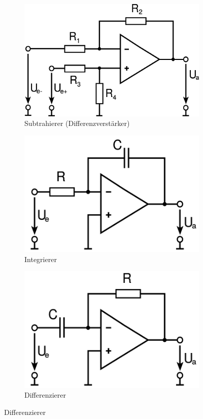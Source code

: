 	\begin{figure}[h]
		\begin{subfigure}{0.25\textwidth}
		\includegraphics[width=\textwidth]{images/Differential_Amplifier}
		\caption{Subtrahierer (Differenzverstärker)}
		\end{subfigure}
		\begin{subfigure}{0.25\textwidth}
		\includegraphics[width=\textwidth]{images/Integrating_Amplifier}
		\caption{Integrierer}
		\end{subfigure}
		\begin{subfigure}{0.25\textwidth}
		\includegraphics[width=\textwidth]{images/Differentiating_Amplifier}
		\caption{Differenzierer}
		\end{subfigure}
	\end{figure}
